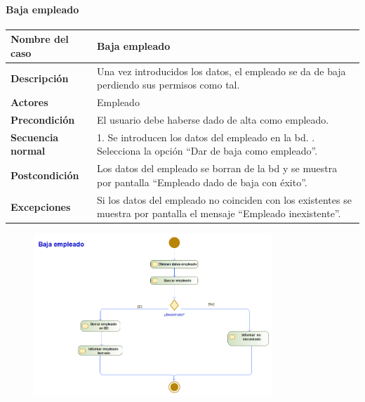 \paragraph{Baja empleado}
\begin{table}[H]
    \centering
    \small
    \begin{tabularx}{0.8\textwidth}{|p{3.5cm}|X|}
        \hline
        \rowcolor{lightgray}
        \textbf{Nombre del caso}  & \textbf{Baja empleado}                                                                                                 \\
        \hline
        \textbf{Descripción}      & Una vez introducidos los datos, el empleado se da de baja perdiendo sus permisos como tal.                             \\
        \hline
        \textbf{Actores}          & Empleado                                                                                                               \\
        \hline
        \textbf{Precondición}     & El usuario debe haberse dado de alta como empleado.                                                                    \\
        \hline
        \textbf{Secuencia normal} & 1. Se introducen los datos del empleado en la \gls{bd}. \newline
        2. Selecciona la opción ``Dar de baja como empleado''.                                                                                             \\
        \hline
        \textbf{Postcondición}    & Los datos del empleado se borran de la \gls{bd} y se muestra por pantalla ``Empleado dado de baja con éxito''.         \\
        \hline
        \textbf{Excepciones}      & Si los datos del empleado no coinciden con los existentes se muestra por pantalla el mensaje ``Empleado inexistente''. \\
        \hline
    \end{tabularx}
\end{table}
\begin{figure}[H]
    \centering
    \includegraphics[width=0.8\textwidth]{Use_Cases/Baja empleado.png}
\end{figure}
\newpage
